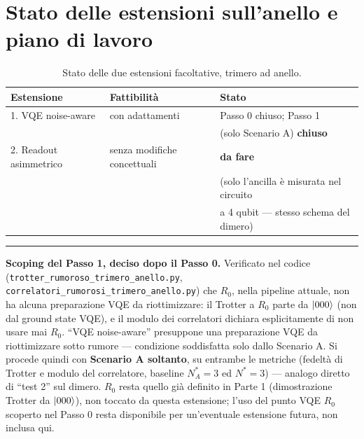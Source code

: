 \documentclass[11pt,a4paper]{article}
\begin{document}
\section{Stato delle estensioni sull'anello e piano di lavoro}

\begin{table}[htbp]
\centering
\caption{Stato delle due estensioni facoltative, trimero ad anello.}
\label{tab:anello-estensioni-stato}
\begin{tabular}{lll}
\toprule
Estensione & Fattibilità & Stato \\
\midrule
1. VQE noise-aware & con adattamenti & Passo 0 chiuso; Passo 1 \\
   & & (solo Scenario A) \textbf{chiuso} \\
2. Readout asimmetrico & senza modifiche concettuali & \textbf{da fare} \\
   & & (solo l'ancilla è misurata nel circuito \\
   & & a 4 qubit --- stesso schema del dimero) \\
\bottomrule
\end{tabular}
\end{table}

\begin{center}
\begin{minipage}{0.93\textwidth}
\small\textcolor{rossos}{\rule{2.2em}{1.1pt}}\enspace
\textcolor{rossos}{\textbf{Scoping del Passo 1, deciso dopo il Passo 0.}}\enspace
Verificato nel codice (\texttt{trotter\_rumoroso\_trimero\_anello.py},
\texttt{correlatori\_rumorosi\_trimero\_anello.py}) che $R_0$, nella
pipeline attuale, non ha alcuna preparazione VQE da riottimizzare: il
Trotter a $R_0$ parte da $\lvert 000\rangle$ (non dal ground state VQE), e il
modulo dei correlatori dichiara esplicitamente di non usare mai $R_0$.
``VQE noise-aware'' presuppone una preparazione VQE da riottimizzare sotto
rumore --- condizione soddisfatta solo dallo Scenario A. Si procede quindi
con \textbf{Scenario A soltanto}, su entrambe le metriche (fedeltà di
Trotter e modulo del correlatore, baseline $N^*_A=3$ ed $N^*=3$) ---
analogo diretto di ``test 2'' sul dimero. $R_0$ resta quello già definito
in Parte 1 (dimostrazione Trotter da $\lvert 000\rangle$), non toccato da questa
estensione; l'uso del punto VQE $R_0$ scoperto nel Passo 0 resta
disponibile per un'eventuale estensione futura, non inclusa qui.
\end{minipage}
\end{center}
\medskip
\end{document}
